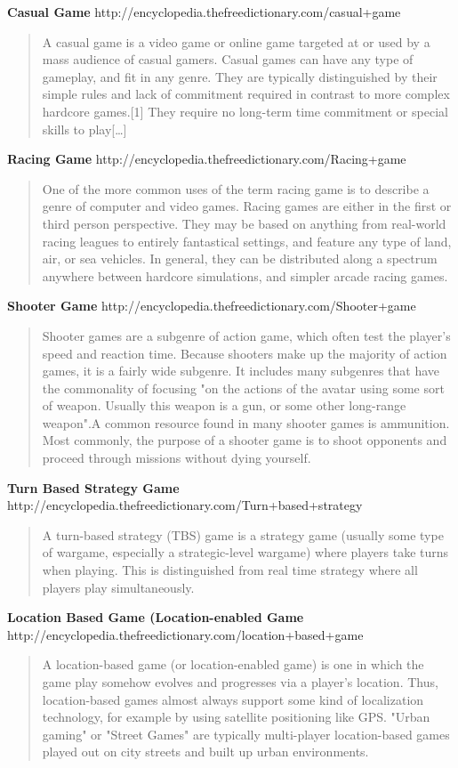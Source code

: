\textbf{Casual Game}		
	http://encyclopedia.thefreedictionary.com/casual+game
\begin{quote}
A casual game is a video game or online game targeted at or used by a mass
audience of casual gamers. Casual games can have any type of gameplay, and fit
in any genre. They are typically distinguished by their simple rules and lack of
commitment required in contrast to more complex hardcore games.[1] They require
no long-term time commitment or special skills to play[\ldots]
\end{quote}

\textbf{Racing Game}
	http://encyclopedia.thefreedictionary.com/Racing+game
\begin{quote}
One of the more common uses of the term racing game is to describe a genre of
computer and video games. Racing games are either in the first or third person
perspective. They may be based on anything from real-world racing leagues to
entirely fantastical settings, and feature any type of land, air, or sea
vehicles. In general, they can be distributed along a spectrum anywhere between
hardcore simulations, and simpler arcade racing games.
\end{quote}
\textbf{Shooter Game}
	http://encyclopedia.thefreedictionary.com/Shooter+game
\begin{quote}
Shooter games are a subgenre of action game, which often test the player's speed
and reaction time. Because shooters make up the majority of action games, it is
a fairly wide subgenre. It includes many subgenres that have the commonality of
focusing "on the actions of the avatar using some sort of weapon. Usually this
weapon is a gun, or some other long-range weapon".A common resource found in
many shooter games is ammunition. Most commonly, the purpose of a shooter
game is to shoot opponents and proceed through missions without dying yourself.
\end{quote}
	
\textbf{Turn Based Strategy Game}
	http://encyclopedia.thefreedictionary.com/Turn+based+strategy
\begin{quote}
A turn-based strategy (TBS) game is a strategy game (usually some type of
wargame, especially a strategic-level wargame) where players take turns when
playing. This is distinguished from real time strategy where all players play
simultaneously.
\end{quote}

\textbf{Location Based Game (Location-enabled Game}
	http://encyclopedia.thefreedictionary.com/location+based+game
\begin{quote}
A location-based game (or location-enabled game) is one in which the game play
somehow evolves and progresses via a player's location. Thus, location-based
games almost always support some kind of localization technology, for example by
using satellite positioning like GPS. "Urban gaming" or "Street Games" are
typically multi-player location-based games played out on city streets and built
up urban environments.
\end{quote}